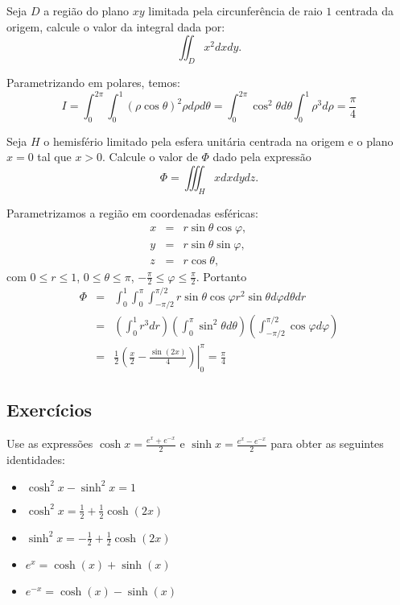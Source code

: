 \begin{exeresol}Seja $D$ a região do plano $xy$ limitada pela circunferência de raio $1$ centrada da origem, calcule o valor da integral dada por:
$$\iint_D x^2 dxdy.$$
\end{exeresol}
\begin{resol}Parametrizando em polares, temos:
$$I= \int_0^{2\pi}\int_0^1 (\rho\cos\theta)^2\rho d\rho d\theta=\int_{0}^{2\pi}\cos^2\theta d\theta\int_0^1\rho^3d\rho=\frac{\pi}{4}$$
\end{resol}


\begin{exeresol} Seja $H$ o hemisfério limitado pela esfera unitária centrada na origem e o plano $x=0$ tal que $x>0$. Calcule o valor de $\Phi$ dado pela expressão
$$\Phi=\iiint_Hx dxdydz.$$ 
\end{exeresol}
\begin{resol}Parametrizamos a região em coordenadas esféricas:
\begin{eqnarray*}
x&=&r\sin\theta\cos\varphi,\\ y&=&r\sin\theta\sin\varphi,\qquad \\z&=&r\cos\theta,
\end{eqnarray*}
com $0\leq r \leq 1$, $0\leq \theta\leq {\pi}$, $-\frac{\pi}{2}\leq \varphi\leq \frac{\pi}{2}$.  
Portanto
\begin{eqnarray*}
\Phi&=&\int_0^1\int_0^\pi\int_{-\pi/2}^{\pi/2}r\sin\theta\cos\varphi r^2\sin\theta d\varphi d\theta dr\\
&=&\left(\int_0^1r^3dr\right)\left(\int_0^\pi\sin^2\theta d\theta \right)\left(\int_{-\pi/2}^{\pi/2}\cos\varphi d\varphi\right)\\
&=&\frac{1}{2}\left.\left(\frac{x}{2}-\frac{\sin(2x)}{4}\right)\right|_0^{\pi}=\frac{\pi}{4}
\end{eqnarray*}
\end{resol}


\subsection*{Exercícios}


\begin{exer}Use as expressões $\cosh x=\frac{e^x+e^{-x}}{2}$ e $\sinh x=\frac{e^x-e^{-x}}{2}$ para obter as seguintes identidades:
\begin{itemize}
\item $\cosh^2x-\sinh^2x=1$
\item $\cosh^2x=\frac{1}{2}+\frac{1}{2}\cosh(2x)$
\item $\sinh^2x=-\frac{1}{2}+\frac{1}{2}\cosh(2x)$
\item $e^x=\cosh(x)+\sinh(x)$
\item $e^{-x}=\cosh(x)-\sinh(x)$

\end{itemize}
\end{exer}

